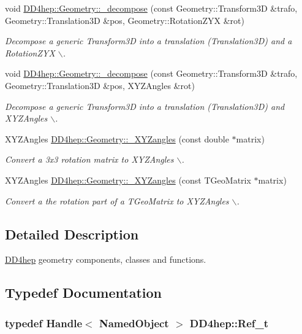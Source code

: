 \begin{DoxyCompactItemize}
void \hyperlink{group___d_d4_h_e_p___g_e_o_m_e_t_r_y_ga46814636f071d07ca4567f3244884664}{DD4hep::Geometry::\_\-decompose} (const Geometry::Transform3D \&trafo, Geometry::Translation3D \&pos, Geometry::RotationZYX \&rot)
\begin{DoxyCompactList}\small\item\em Decompose a generic Transform3D into a translation (Translation3D) and a RotationZYX $\backslash$. \item\end{DoxyCompactList}\item 
void \hyperlink{group___d_d4_h_e_p___g_e_o_m_e_t_r_y_gafde0308d492794fe4b55f66247921482}{DD4hep::Geometry::\_\-decompose} (const Geometry::Transform3D \&trafo, Geometry::Translation3D \&pos, XYZAngles \&rot)
\begin{DoxyCompactList}\small\item\em Decompose a generic Transform3D into a translation (Translation3D) and XYZAngles $\backslash$. \item\end{DoxyCompactList}\item 
XYZAngles \hyperlink{group___d_d4_h_e_p___g_e_o_m_e_t_r_y_ga446608ca1668ae2b3ad24c3ea5b2bc1e}{DD4hep::Geometry::\_\-XYZangles} (const double $\ast$matrix)
\begin{DoxyCompactList}\small\item\em Convert a 3x3 rotation matrix to XYZAngles $\backslash$. \item\end{DoxyCompactList}\item 
XYZAngles \hyperlink{group___d_d4_h_e_p___g_e_o_m_e_t_r_y_gaf4d63a5a06b85c2a65143cc5f15a81fe}{DD4hep::Geometry::\_\-XYZangles} (const TGeoMatrix $\ast$matrix)
\begin{DoxyCompactList}\small\item\em Convert a the rotation part of a TGeoMatrix to XYZAngles $\backslash$. \item\end{DoxyCompactList}\end{DoxyCompactItemize}


\subsection{Detailed Description}
\hyperlink{namespace_d_d4hep}{DD4hep} geometry components, classes and functions. 

\subsection{Typedef Documentation}
\hypertarget{group___d_d4_h_e_p___g_e_o_m_e_t_r_y_ga40af83be6718bb8828a3d83dc7f8c930}{
\subsubsection[{Ref\_\-t}]{\setlength{\rightskip}{0pt plus 5cm}typedef Handle$<$ NamedObject $>$ {\bf DD4hep::Ref\_\-t}}}
\label{group___d_d4_h_e_p___g_e_o_m_e_t_r_y_ga40af83be6718bb8828a3d83dc7f8c930}


